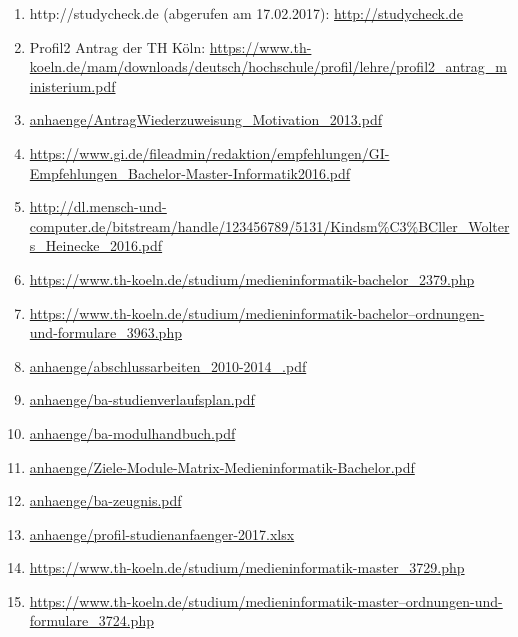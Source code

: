 \documentclass[BCOR12mm,DIV11,titlepage,a4paper,oneside,10pt]{scrbook}
\begin{document}
\begin{enumerate}
\item{http://studycheck.de (abgerufen am 17.02.2017): \href{http://studycheck.de}{http://studycheck.de} } 
\item{Profil2 Antrag der TH Köln: \href{https://www.th-koeln.de/mam/downloads/deutsch/hochschule/profil/lehre/profil2\_antrag\_ministerium.pdf}{https://www.th-koeln.de/mam/downloads/deutsch/hochschule/profil/lehre/profil2\_antrag\_ministerium.pdf} } 
\item{\href{anhaenge/AntragWiederzuweisung\_Motivation\_2013.pdf}{anhaenge/AntragWiederzuweisung\_Motivation\_2013.pdf} } 
\item{\href{https://www.gi.de/fileadmin/redaktion/empfehlungen/GI-Empfehlungen\_Bachelor-Master-Informatik2016.pdf}{https://www.gi.de/fileadmin/redaktion/empfehlungen/GI-Empfehlungen\_Bachelor-Master-Informatik2016.pdf} } 
\item{\href{http://dl.mensch-und-computer.de/bitstream/handle/123456789/5131/Kindsm\%C3\%BCller\_Wolters\_Heinecke\_2016.pdf}{http://dl.mensch-und-computer.de/bitstream/handle/123456789/5131/Kindsm\%C3\%BCller\_Wolters\_Heinecke\_2016.pdf} } 
\item{\href{https://www.th-koeln.de/studium/medieninformatik-bachelor\_2379.php}{https://www.th-koeln.de/studium/medieninformatik-bachelor\_2379.php} } 
\item{\href{https://www.th-koeln.de/studium/medieninformatik-bachelor--ordnungen-und-formulare\_3963.php}{https://www.th-koeln.de/studium/medieninformatik-bachelor--ordnungen-und-formulare\_3963.php} } 
\item{\href{anhaenge/abschlussarbeiten\_2010-2014\_.pdf}{anhaenge/abschlussarbeiten\_2010-2014\_.pdf} } 
\item{\href{anhaenge/ba-studienverlaufsplan.pdf}{anhaenge/ba-studienverlaufsplan.pdf} } 
\item{\href{anhaenge/ba-modulhandbuch.pdf}{anhaenge/ba-modulhandbuch.pdf} } 
\item{\href{anhaenge/Ziele-Module-Matrix-Medieninformatik-Bachelor.pdf}{anhaenge/Ziele-Module-Matrix-Medieninformatik-Bachelor.pdf} } 
\item{\href{anhaenge/ba-zeugnis.pdf}{anhaenge/ba-zeugnis.pdf} } 
\item{\href{anhaenge/profil-studienanfaenger-2017.xlsx}{anhaenge/profil-studienanfaenger-2017.xlsx} } 
\item{\href{https://www.th-koeln.de/studium/medieninformatik-master\_3729.php}{https://www.th-koeln.de/studium/medieninformatik-master\_3729.php} } 
\item{\href{https://www.th-koeln.de/studium/medieninformatik-master--ordnungen-und-formulare\_3724.php}{https://www.th-koeln.de/studium/medieninformatik-master--ordnungen-und-formulare\_3724.php} } 

\end{enumerate}
\end{document}
